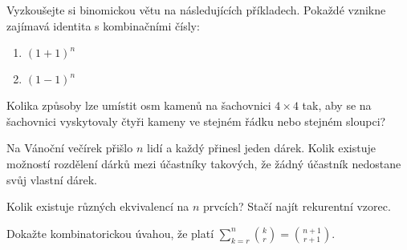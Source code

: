 \documentclass[10pt]{article}
\begin{document}
\begin{problem}
Vyzkoušejte si binomickou větu na následujících příkladech. Pokaždé vznikne zajímavá identita s kombinačními čísly:
\begin{enumerate}[label=\alph*)]
    \item $(1+1)^n$
    \item $(1-1)^n$
\end{enumerate}
\end{problem}

\begin{problem}
Kolika způsoby lze umístit osm kamenů na šachovnici $4\times4$ tak, aby se na šachovnici vyskytovaly čtyři kameny ve stejném řádku nebo stejném sloupci?
\end{problem}

\begin{problem}
Na Vánoční večírek přišlo $n$ lidí a každý přinesl jeden dárek. Kolik existuje možností rozdělení dárků mezi účastníky takových, že žádný účastník nedostane svůj vlastní dárek.
\end{problem}

\begin{problem}
Kolik existuje různých ekvivalencí na $n$ prvcích? Stačí najít rekurentní vzorec.
\end{problem}

\begin{problem}
Dokažte kombinatorickou úvahou, že platí $\sum_{k=r}^{n}\binom{k}{r} = \binom{n+1}{r+1}$.
\end{problem}
\end{document}
